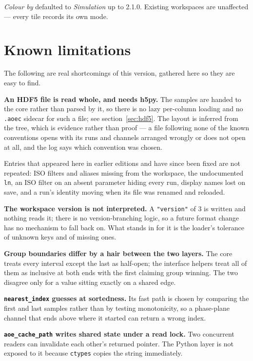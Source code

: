 \documentclass[11pt,a4paper,oneside]{report}
\newcommand{\code}[1]{\texttt{#1}}
\begin{document}
\emph{Colour by} defaulted to \emph{Simulation} up to 2.1.0. Existing
workspaces are unaffected --- every tile records its own mode.

\chapter{Known limitations}

The following are real shortcomings of this version, gathered here so they are
easy to find.

\textbf{An HDF5 file is read whole, and needs h5py.} The samples are handed to
the core rather than parsed by it, so there is no lazy per-column loading and no
\code{.aoec} sidecar for such a file; see section~\ref{sec:hdf5}. The layout is
inferred from the tree, which is evidence rather than proof --- a file following
none of the known conventions opens with its runs and channels arranged wrongly
or does not open at all, and the log says which convention was chosen.

Entries that appeared here in earlier editions and have since been fixed are not
repeated: ISO filters and aliases missing from the workspace, the undocumented
\code{ln}, an ISO filter on an absent parameter hiding every run, display names
lost on save, and a run's identity moving when its file was renamed and
reloaded.

\textbf{The workspace version is not interpreted.} A \code{"version"} of 3 is
written and nothing reads it; there is no version-branching logic, so a future
format change has no mechanism to fall back on. What stands in for it is the
loader's tolerance of unknown keys and of missing ones.

\textbf{Group boundaries differ by a hair between the two layers.} The core
treats every interval except the last as half-open; the interface helpers treat
all of them as inclusive at both ends with the first claiming group winning. The
two disagree only for a value sitting exactly on a shared edge.

\textbf{\code{nearest\_index} guesses at sortedness.} Its fast path is chosen by
comparing the first and last samples rather than by testing monotonicity, so a
phase-plane channel that ends above where it started can return a wrong index.

\textbf{\code{aoe\_cache\_path} writes shared state under a read lock.} Two
concurrent readers can invalidate each other's returned pointer. The Python
layer is not exposed to it because \code{ctypes} copies the string immediately.
\end{document}
